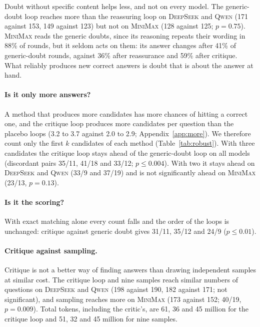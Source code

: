 \documentclass[11pt]{article}
\newcommand{\ds}{\textsc{DeepSeek}}
\newcommand{\qw}{\textsc{Qwen}}
\newcommand{\mm}{\textsc{MiniMax}}
\begin{document}
Doubt without specific content helps less, and not on every model.
The generic-doubt loop reaches more than the reassuring loop on \ds{} and \qw{} (171 against 153, 149 against 123) but not on \mm{} (128 against 125; $p=0.75$).
\mm{} reads the generic doubts, since its reasoning repeats their wording in 88\% of rounds, but it seldom acts on them: its answer changes after 41\% of generic-doubt rounds, against 36\% after reassurance and 59\% after critique.
What reliably produces new correct answers is doubt that is about the answer at hand.

\paragraph{Is it only more answers?}
A method that produces more candidates has more chances of hitting a correct one, and the critique loop produces more candidates per question than the placebo loops (3.2 to 3.7 against 2.0 to 2.9; Appendix~\ref{app:more}).
We therefore count only the first $k$ candidates of each method (Table~\ref{tab:robust}).
With three candidates the critique loop stays ahead of the generic-doubt loop on all models (discordant pairs 35/11, 41/18 and 33/12; $p\le 0.004$).
With two it stays ahead on \ds{} and \qw{} (33/9 and 37/19) and is not significantly ahead on \mm{} (23/13, $p=0.13$).

\paragraph{Is it the scoring?}
With exact matching alone every count falls and the order of the loops is unchanged: critique against generic doubt gives 31/11, 35/12 and 24/9 ($p\le 0.01$).

\paragraph{Critique against sampling.}
Critique is not a better way of finding answers than drawing independent samples at similar cost.
The critique loop and nine samples reach similar numbers of questions on \ds{} and \qw{} (198 against 190, 182 against 171; not significant), and sampling reaches more on \mm{} (173 against 152; 40/19, $p=0.009$).
Total tokens, including the critic's, are 61, 36 and 45 million for the critique loop and 51, 32 and 45 million for nine samples.
\end{document}
